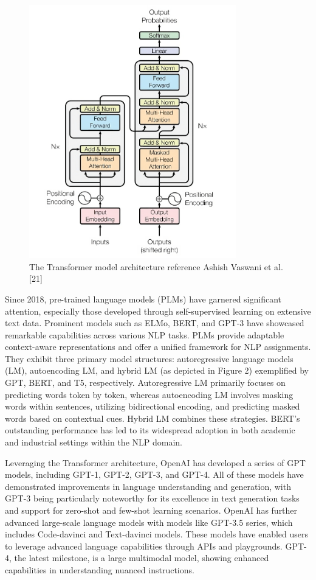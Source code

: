 \documentclass[conference]{IEEEtran}
\begin{document}
\begin{figure}[htp]
    \includegraphics[width=9cm]{transformer}
    \caption{The Transformer model architecture reference Ashish Vaswani et al. [21]}
    \label{fig:galaxy}
\end{figure}

Since 2018, pre-trained language models (PLMs) have garnered significant attention, especially those developed through self-supervised learning on extensive text data. Prominent models such as ELMo, BERT, and GPT-3 have showcased remarkable capabilities across various NLP tasks. PLMs provide adaptable context-aware representations and offer a unified framework for NLP assignments. They exhibit three primary model structures: autoregressive language models (LM), autoencoding LM, and hybrid LM (as depicted in Figure 2) exemplified by GPT, BERT, and T5, respectively. Autoregressive LM primarily focuses on predicting words token by token, whereas autoencoding LM involves masking words within sentences, utilizing bidirectional encoding, and predicting masked words based on contextual cues. Hybrid LM combines these strategies. BERT's outstanding performance has led to its widespread adoption in both academic and industrial settings within the NLP domain.

Leveraging the Transformer architecture, OpenAI has developed a series of GPT models, including GPT-1, GPT-2, GPT-3, and GPT-4. All of these models have demonstrated improvements in language understanding and generation, with GPT-3 being particularly noteworthy for its excellence in text generation tasks and support for zero-shot and few-shot learning scenarios. OpenAI has further advanced large-scale language models with models like GPT-3.5 series, which includes Code-davinci and Text-davinci models. These models have enabled users to leverage advanced language capabilities through APIs and playgrounds. GPT-4, the latest milestone, is a large multimodal model, showing enhanced capabilities in understanding nuanced instructions.
\end{document}
